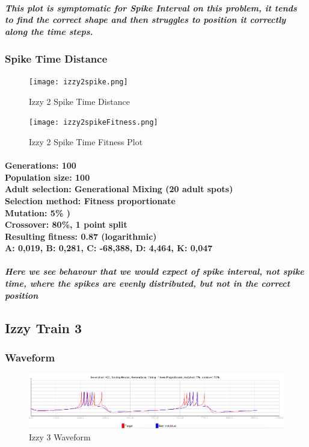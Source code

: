 \documentclass[titlepage,norsk]{article}
\begin{document}
\subparagraph{This plot is symptomatic for Spike Interval on this problem, it tends to find the correct shape and then struggles to position it correctly along the time steps.}

\subsubsection{Spike Time  Distance}

\begin{figure}[h!]
\centering
\texttt{[image: izzy2spike.png]}
\caption{Izzy 2 Spike Time Distance}
\label{fig:awesome_image}
\end{figure}

\begin{figure}[h!]
\centering
\texttt{[image: izzy2spikeFitness.png]}
\caption{Izzy 2 Spike Time Fitness Plot}
\label{fig:awesome_image}
\end{figure}

\paragraph{
Generations: 100\\
Population size: 100\\
Adult selection: Generational Mixing (20 adult spots) \\
Selection method: Fitness proportionate\\
Mutation:  5\% )\\
Crossover: 80\%, 1 point split \\
Resulting fitness: 0.87 (logarithmic) \\
A: 0,019, B: 0,281, C: -68,388, D: 4,464, K: 0,047  \\
}

\subparagraph{Here we see behavour that we would expect of spike interval, not spike time, where the spikes are evenly distributed, but not in the correct position}


\subsection{Izzy Train 3}

\subsubsection{Waveform}

\begin{figure}[h!]
\centering
\includegraphics[scale=0.75]{izzy3wave.png}
\caption{Izzy 3 Waveform}
\label{fig:awesome_image}
\end{figure}
\end{document}
